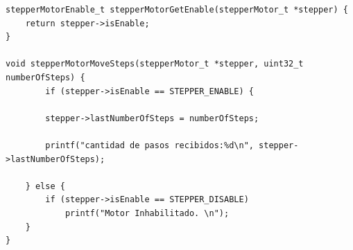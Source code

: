 \begin{lstlisting}[label=cod:vControl,caption=Porción simplificada del archivo de código fuente con algunas funciones de la implementación de la clase StepperMotor.]
stepperMotorEnable_t stepperMotorGetEnable(stepperMotor_t *stepper) {
	return stepper->isEnable;
}

void stepperMotorMoveSteps(stepperMotor_t *stepper, uint32_t numberOfSteps) {
		if (stepper->isEnable == STEPPER_ENABLE) {
		
		stepper->lastNumberOfSteps = numberOfSteps;

		printf("cantidad de pasos recibidos:%d\n", stepper->lastNumberOfSteps);
		
	} else {
		if (stepper->isEnable == STEPPER_DISABLE)
			printf("Motor Inhabilitado. \n");
	}
}


\end{lstlisting}
%
%
%
%
%
%	
%		
%
%		
%		
%		
%		




